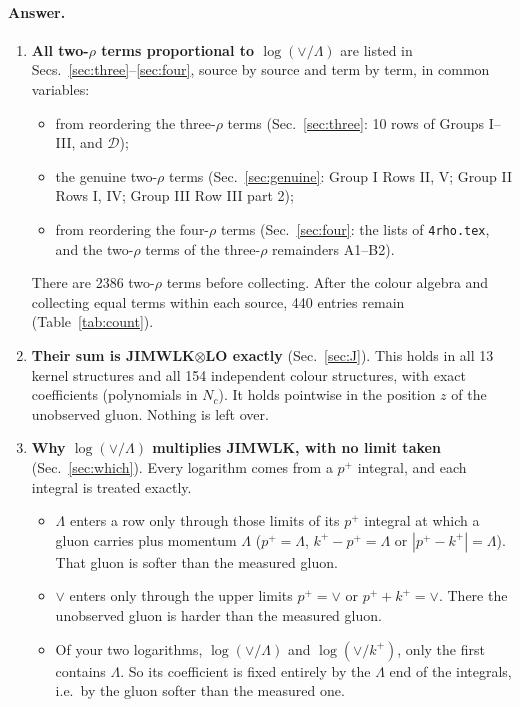 \documentclass[10pt]{article}
\numberwithin{equation}{section}
\begin{document}
\paragraph{Answer.}
\begin{enumerate}
\item \textbf{All two-$\rho$ terms proportional to $\log(\vee/\Lambda)$} are listed in Secs.~\ref{sec:three}--\ref{sec:four}, source by source and term by term, in common variables:
\begin{itemize}
\item from reordering the three-$\rho$ terms (Sec.~\ref{sec:three}: 10 rows of Groups I--III, and $\mathcal D$);
\item the genuine two-$\rho$ terms (Sec.~\ref{sec:genuine}: Group I Rows II, V; Group II Rows I, IV; Group III Row III part 2);
\item from reordering the four-$\rho$ terms (Sec.~\ref{sec:four}: the lists of \texttt{4rho.tex}, and the two-$\rho$ terms of the three-$\rho$ remainders A1--B2).
\end{itemize}
There are 2386 two-$\rho$ terms before collecting. After the colour algebra and collecting equal terms within each source, 440 entries remain (Table~\ref{tab:count}).
\item \textbf{Their sum is JIMWLK$\otimes$LO exactly} (Sec.~\ref{sec:J}). This holds in all 13 kernel structures and all 154 independent colour structures, with exact coefficients (polynomials in $N_c$). It holds pointwise in the position $z$ of the unobserved gluon. Nothing is left over.
\item \textbf{Why $\log(\vee/\Lambda)$ multiplies JIMWLK, with no limit taken} (Sec.~\ref{sec:which}). Every logarithm comes from a $p^+$ integral, and each integral is treated exactly.
\begin{itemize}
\item $\Lambda$ enters a row only through those limits of its $p^+$ integral at which a gluon carries plus momentum $\Lambda$ ($p^+=\Lambda$, $k^+-p^+=\Lambda$ or $|p^+-k^+|=\Lambda$). That gluon is softer than the measured gluon.
\item $\vee$ enters only through the upper limits $p^+=\vee$ or $p^++k^+=\vee$. There the unobserved gluon is harder than the measured gluon.
\item Of your two logarithms, $\log(\vee/\Lambda)$ and $\log(\vee/k^+)$, only the first contains $\Lambda$. So its coefficient is fixed entirely by the $\Lambda$ end of the integrals, i.e.\ by the gluon softer than the measured one.
\end{itemize}

\end{enumerate}
\end{document}
